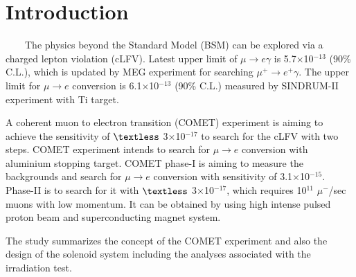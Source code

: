 \documentclass[a4paper, 10pt, twocolumn]{article}
\title{\begin{CJK}{UTF8}{min}\normalsize Radiation study on the Superconducting Solenoid Magnet for $\mu^- \rightarrow e^-$ Conversion Experiment\\
\author{\begin{CJK}{UTF8}{min} ~~~~~~~~~~~~~~~~~~~~~~~~~~~~~~~~~~~~~~~~~~~~~~~~~~~~~~~~~~~~~~~~~~~~~~~~~~~~~~~~~~~~~~~~~~~~~~~~~~~~~~~~~~~~~~~~~~~~~~~~~~~~~                               ~~~$BML(B $B3p(B\end{CJK}}
\date{}
\begin{document}
\maketitle

\section{Introduction}
~~~~The physics beyond the Standard Model (BSM) can be explored via a charged lepton violation (cLFV).
Latest upper limit of $\mu \rightarrow e\gamma$ is 5.7$\times$10$^{-13}$ (90\% C.L.)\cite{meg}, which is updated by MEG experiment for searching $\mu^+ \rightarrow e^+\gamma$.%
The upper limit for $\mu \rightarrow e$ conversion is 6.1$\times$10$^{-13}$ (90\% C.L.)\cite{sin} measured by SINDRUM-II experiment with Ti target.

A coherent muon to electron transition (COMET) experiment is aiming to achieve the sensitivity of $\textless$ 3$\times$10$^{-17}$ to search for the cLFV with two steps.
COMET experiment intends to search for $\mu \rightarrow e$ conversion with aluminium stopping target.
COMET phase-I is aiming to measure the backgrounds and search for $\mu \rightarrow e$ conversion with sensitivity of 3.1$\times$10$^{-15}$.
Phase-II is to search for it with $\textless$ 3$\times$10$^{-17}$, which requires 10$^{11}$ $\mu^-$/sec muons with low momentum.
It can be obtained by using high intense pulsed proton beam and superconducting magnet system.

The study summarizes the concept of the COMET experiment and also the design of the solenoid system including the analyses associated with the irradiation test.
\end{document}

